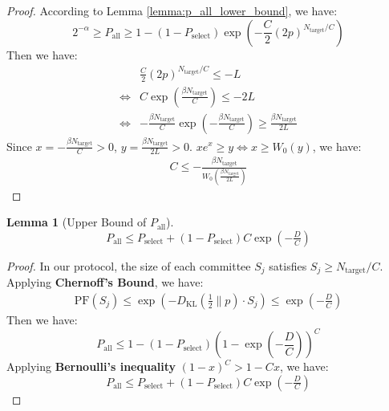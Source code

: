 \documentclass[journal]{IEEEtran}
\newtheorem{lemma}{Lemma}
\begin{document}
\begin{proof}
According to Lemma \ref{lemma:p_all_lower_bound}, we have:
\begin{equation}
2^{-\alpha} \ge P_{\text{all}} \ge 1 - (1 - P_{\text{select}}) \exp\left(- \frac{C}{2} (2p)^{N_{\text{target}} / C} \right)
\end{equation}
Then we have:
\begin{align}
&\frac{C}{2} (2p)^{N_{\text{target}} / C} \leq -L \nonumber\\
\iff &C \exp(\frac{\beta N_{\text{target}}}{C}) \le -2L \nonumber\\
\iff &-\frac{\beta N_{\text{target}}}{C}\exp(-\frac{\beta N_{\text{target}}}{C}) \ge \frac{\beta N_{\text{target}}}{2L}
\end{align}
Since $x=-\frac{\beta N_{\text{target}}}{C}>0$, $y=\frac{\beta N_{\text{target}}}{2L}>0$. $xe^x \ge y \iff x\ge W_0(y)$, we have:
\begin{align}
C \le -\frac{\beta N_{\text{target}}}{W_0\left( \frac{\beta N_{\text{target}}}{2L} \right)}
\end{align}

\end{proof}

\begin{lemma}[Upper Bound of $P_{\text{all}}$]
\label{lemma:pall_upper_bound}
$$P_{\text{all}} \le P_{\text{select}} + (1 - P_{\text{select}})  C  \exp\left(- \tfrac{D}{C} \right)$$
\end{lemma}
\begin{proof}
In our protocol, the size of each committee $  S_j  $ satisfies $S_j \ge  N_{\text{target}}/C $. Applying \textbf{Chernoff's Bound}\cite{chernoff1952measure}, we have:
\begin{align}
\text{PF}(S_j) \le \exp(-D_{\text{KL}}(\frac{1}{2}\|p) \cdot S_j)
\le \exp(- \frac{D}{C} )
\end{align}
Then we have:
$$P_{\text{all}} \le 1 - (1 - P_{\text{select}}) \left(1 - \exp(-\frac{D}{C}) \right)^C$$
Applying \textbf{Bernoulli's inequality}\cite{bernoulli1689positiones} $(1-x)^C > 1-Cx$, we have:
$$P_{\text{all}} \le P_{\text{select}} + (1 - P_{\text{select}})  C  \exp\left(- \tfrac{D}{C} \right)$$
\end{proof}
\end{document}
